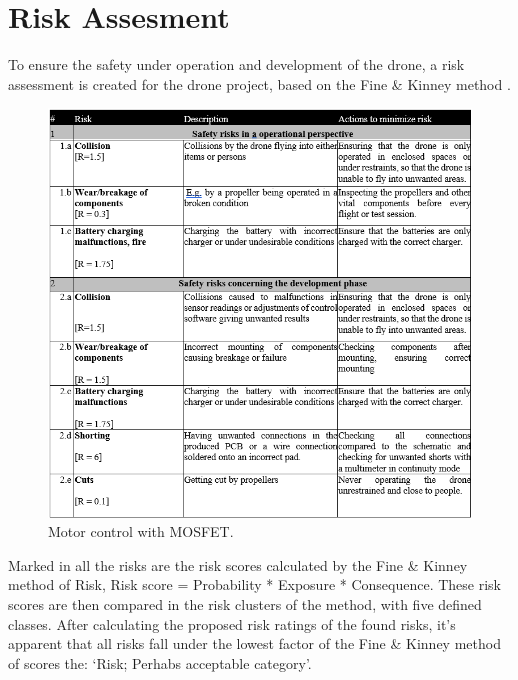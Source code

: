 \section{Risk Assesment}

To ensure the safety under operation and development of the drone, a risk assessment is created for the drone project, based on the Fine \& Kinney method \cite{finekinney}.

\begin{figure}[H]
    \begin{center}
    \includegraphics[scale=0.7]{pictures/Risk assesment table.png}
    \end{center}
    \caption{Motor control with MOSFET.}
    \label{fig:Mosfet_Control}
\end{figure}

Marked in all the risks are the risk scores calculated by the Fine \& Kinney method of Risk, Risk score = Probability * Exposure * Consequence. These risk scores are then compared in the risk clusters of the method, with five defined classes. After calculating the proposed risk ratings of the found risks, it’s apparent that all risks fall under the lowest factor of the Fine \& Kinney method of scores the: ‘Risk; Perhabs acceptable category’. 
